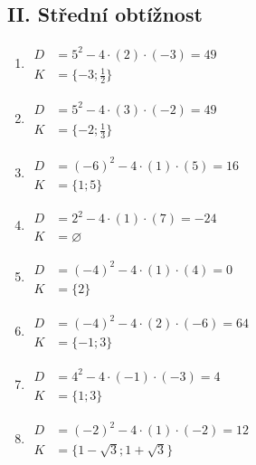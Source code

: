 \documentclass[11pt,a4paper]{article}
\begin{document}
\subsection*{II. Střední obtížnost}
\begin{enumerate}[label={},itemsep=9pt]
\item[\textbf{A021}] \(\displaystyle \begin{aligned}D&=5^2-4\cdot(2)\cdot(-3)=49\\K&=\{-3;\frac{1}{2}\}\end{aligned}\)\par
\item[\textbf{A022}] \(\displaystyle \begin{aligned}D&=5^2-4\cdot(3)\cdot(-2)=49\\K&=\{-2;\frac{1}{3}\}\end{aligned}\)\par
\item[\textbf{A023}] \(\displaystyle \begin{aligned}D&=(-6)^2-4\cdot(1)\cdot(5)=16\\K&=\{1;5\}\end{aligned}\)\par
\item[\textbf{A024}] \(\displaystyle \begin{aligned}D&=2^2-4\cdot(1)\cdot(7)=-24\\K&=\varnothing\end{aligned}\)\par
\item[\textbf{A025}] \(\displaystyle \begin{aligned}D&=(-4)^2-4\cdot(1)\cdot(4)=0\\K&=\{2\}\end{aligned}\)\par
\item[\textbf{A026}] \(\displaystyle \begin{aligned}D&=(-4)^2-4\cdot(2)\cdot(-6)=64\\K&=\{-1;3\}\end{aligned}\)\par
\item[\textbf{A027}] \(\displaystyle \begin{aligned}D&=4^2-4\cdot(-1)\cdot(-3)=4\\K&=\{1;3\}\end{aligned}\)\par
\item[\textbf{A028}] \(\displaystyle \begin{aligned}D&=(-2)^2-4\cdot(1)\cdot(-2)=12\\K&=\{1 - \sqrt{3};1 + \sqrt{3}\}\end{aligned}\)\par

\end{enumerate}
\end{document}
